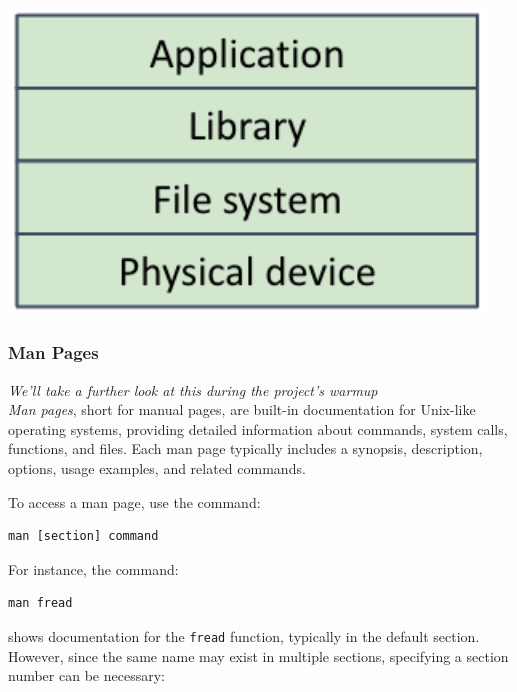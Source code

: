 \begin{minipage}{0.25\textwidth}
\begin{center}
  \includegraphics[width=0.95\textwidth]{chapters/L6/images/layers.png}
\end{center}
\end{minipage}

\newpage
\subsubsection{Man Pages}
\textit{We'll take a further look at this during the project's warmup}\\
\textit{Man pages}, short for manual pages, are built-in documentation for Unix-like operating systems, providing detailed information about commands, system calls, functions, and files. Each man page typically includes a synopsis, description, options, usage examples, and related commands.

To access a man page, use the command:
\begin{center}
\begin{verbatim}
man [section] command
\end{verbatim}
\end{center}

For instance, the command:
\begin{center}
\begin{verbatim}
man fread
\end{verbatim}
\end{center}

shows documentation for the \texttt{fread} function, typically in the default section. However, since the same name may exist in multiple sections, specifying a section number can be necessary:

